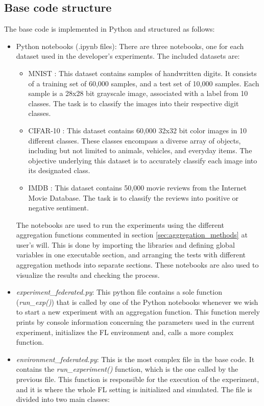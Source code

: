 \subsection{Base code structure} \label{sec:base_code}
The base code is implemented in Python and structured as follows:
\begin{itemize}
        \item Python notebooks (.ipynb files): There are three notebooks, one for each dataset used in the developer's experiments. The included datasets are:
        \begin{itemize}
                \item MNIST \cite{MNIST}: This dataset contains samples of handwritten digits. It consists of a training set of 60,000 samples, and a test set of 10,000 samples. Each sample is a 28x28 bit grayscale image, associated with a label from 10 classes. The task is to classify the images into their respective digit classes.
                \item CIFAR-10 \cite{CIFAR10}: This dataset contains 60,000 32x32 bit color images in 10 different classes. These classes encompass a diverse array of objects, including but not limited to animals, vehicles, and everyday items. The objective underlying this dataset is to accurately classify each image into its designated class.
                \item IMDB \cite{IMDB}: This dataset contains 50,000 movie reviews from the Internet Movie Database. The task is to classify the reviews into positive or negative sentiment.
        \end{itemize}
        The notebooks are used to run the experiments using the different aggregation functions commented in section \ref{sec:aggregation_methods} at user's will. This is done by importing the libraries and defining global variables in one executable section, and arranging the tests with different aggregation methods into separate sections. These notebooks are also used to visualize the results and checking the process.
        \item \textit{experiment\_federated.py}: This python file contains a sole function (\textit{run\_exp()}) that is called by one of the Python notebooks whenever we wish to start a new experiment with an aggregation function. This function merely prints by console information concerning the parameters used in the current experiment, initializes the FL environment and, calls a more complex function.
        \item \textit{environment\_federated.py}: This is the most complex file in the base code. It contains the \textit{run\_experiment()} function, which is the one called by the previous file. This function is responsible for the execution of the experiment, and it is where the whole FL setting is initialized and simulated. The file is divided into two main classes:

\end{itemize}
